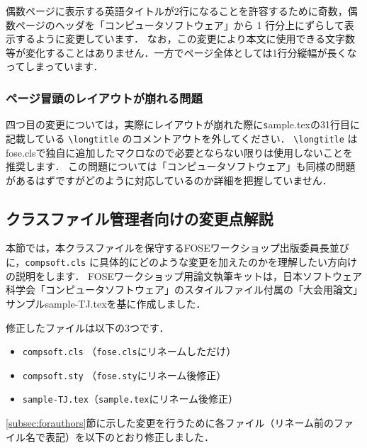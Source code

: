 \documentclass[T,J]{fose} %
\newcommand{\foseclassfile}{fose.cls}
\begin{document}
偶数ページに表示する英語タイトルが2行になることを許容するために奇数，偶数ページのヘッダを「コンピュータソフトウェア」から 1 行分上にずらして表示するように変更しています．
なお，この変更により本文に使用できる文字数等が変化することはありません．一方でページ全体としては1行分縦幅が長くなってしまっています．


\subsubsection{ページ冒頭のレイアウトが崩れる問題}
四つ目の変更については，実際にレイアウトが崩れた際に{\texttt sample.tex}の31行目に記載している \verb|\longtitle| のコメントアウトを外してください．
\verb|\longtitle| は \foseclassfile で独自に追加したマクロなので必要とならない限りは使用しないことを推奨します．
この問題については「コンピュータソフトウェア」も同様の問題があるはずですがどのように対応しているのか詳細を把握していません．


\subsection{クラスファイル管理者向けの変更点解説} \label{sec:differences}
本節では，本クラスファイルを保守するFOSEワークショップ出版委員長並びに，\texttt{compsoft.cls} に具体的にどのような変更を加えたのかを理解したい方向けの説明をします．
FOSEワークショップ用論文執筆キットは，日本ソフトウェア科学会「コンピュータソフトウェア」のスタイルファイル付属の「大会用論文」サンプルsample-TJ.texを基に作成しました．

修正したファイルは以下の3つです．
\begin{itemize}
	\item \texttt{compsoft.cls} （\texttt{fose.cls}にリネームしただけ）
	\item \texttt{compsoft.sty} （\texttt{fose.sty}にリネーム後修正）
	\item \texttt{sample-TJ.tex}（\texttt{sample.tex}にリネーム後修正）
\end{itemize}

\ref{subsec:forauthors}節に示した変更を行うために各ファイル（リネーム前のファイル名で表記）を以下のとおり修正しました．
\end{document}
